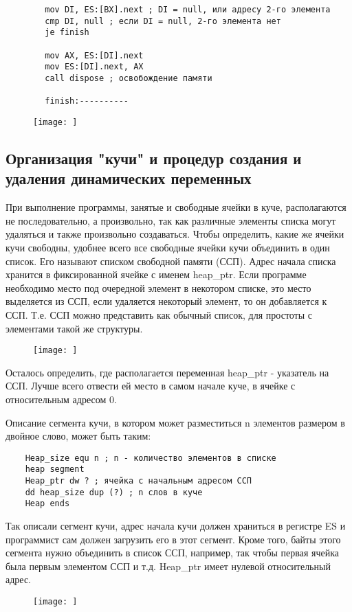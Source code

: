 \begin{enumerate}
\begin{verbatim}
        mov DI, ES:[BX].next ; DI = null, или адресу 2-го элемента
        cmp DI, null ; если DI = null, 2-го элемента нет
        je finish

        mov AX, ES:[DI].next
        mov ES:[DI].next, AX
        call dispose ; освобождение памяти
        
        finish:----------
    \end{verbatim}
    \begin{figure}[H]
        \texttt{[image: ]}
    \end{figure}
\end{enumerate}

\subsection{Организация "кучи" и процедур создания и удаления динамических переменных}

При выполнение программы, занятые и свободные ячейки в куче, располагаются не последовательно, а произвольно, так как различные элементы списка могут удаляться и также произвольно создаваться.
Чтобы определить, какие же ячейки кучи свободны, удобнее всего все свободные ячейки кучи объединить в один список. Его называют списком свободной памяти (ССП). Адрес начала списка хранится в фиксированной ячейке с именем heap_ptr.
Если программе необходимо место под очередной элемент в некотором списке, это место выделяется из ССП, если удаляется некоторый элемент, то он добавляется к ССП. Т.е. ССП можно представить как обычный список, для простоты с элементами такой же структуры.
\begin{figure}[H]
    \texttt{[image: ]}
\end{figure}

Осталось определить, где располагается переменная heap_ptr - указатель на ССП. Лучше всего отвести ей место в самом начале куче, в ячейке с относительным адресом 0.

Описание сегмента кучи, в котором может разместиться n элементов размером в двойное слово, может быть таким:
\begin{verbatim}
    Heap_size equ n ; n - количество элементов в списке
    heap segment
    Heap_ptr dw ? ; ячейка с начальным адресом ССП
    dd heap_size dup (?) ; n слов в куче
    Heap ends
\end{verbatim}

Так описали сегмент кучи, адрес начала кучи должен храниться в регистре ES и программист сам должен загрузить его в этот сегмент. Кроме того, байты этого сегмента нужно объединить в список ССП, например, так чтобы первая ячейка была первым элементом ССП и т.д. Heap_ptr имеет нулевой относительный адрес.
\begin{figure}[H]
    \texttt{[image: ]}
\end{figure}

